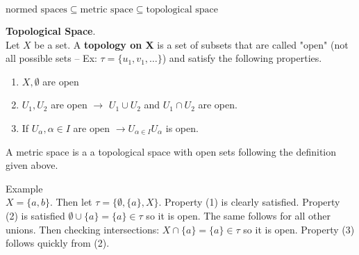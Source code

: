 \documentclass[a4paper]{article}
\begin{document}
\begin{note}
  $\text{normed spaces} \subseteq \text{metric space} \subseteq \text{topological space}$
\end{note}

\begin{definition}
  \textbf{Topological Space}. \\
  Let $X$ be a set. A \textbf{topology on X} is a set of subsets that are called 
  "open" (not all possible sets -- Ex: $\tau = \{u_1,v_1,\ldots\}$) and satisfy the following properties.  
  \begin{enumerate}
    \item $X, \emptyset$ are open
    \item $U_1, U_2$ are open $\to$ $U_1 \cup U_2$ and $U_1 \cap U_2$ are open.
    \item If $U_\alpha, \alpha \in I$ are open $\to U_{\alpha \in I} U_\alpha$ is open.
  \end{enumerate}
\end{definition}

\begin{remark}
  A metric space is a a topological space with open sets following the definition given above. 
\end{remark}

\begin{note}{Example}\\
  $X = \{a, b\}$. Then let $\tau = \{\emptyset, \{a\}, X \}$. Property (1) is clearly satisfied. Property (2) is
  satisfied $\emptyset \cup \{a\} = \{a\} \in \tau$ so it is open. The same follows for all other unions. Then 
  checking intersections: $X \cap \{a\} = \{a\} \in \tau$ so it is open. Property (3) follows quickly from (2).  
\end{note}
\end{document}
